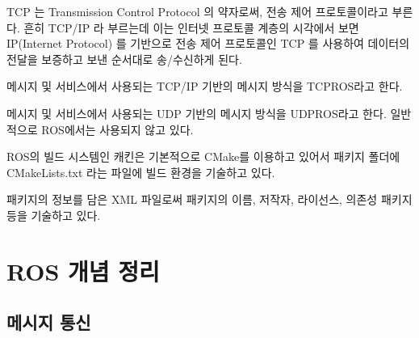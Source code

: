 \vspace{\baselineskip}
\begin{definition}\label{def:RosTCPIP}
TCP 는 Transmission Control Protocol 의 약자로써, 전송 제어 프로토콜이라고 부른다. 흔히 TCP/IP 라 부르는데 이는 인터넷 프로토콜 계층의 시각에서 보면 IP(Internet Protocol) 를 기반으로 전송 제어 프로토콜인 TCP 를 사용하여 데이터의 전달을 보증하고 보낸 순서대로 송/수신하게 된다. 
\end{definition}

\vspace{\baselineskip}
\begin{definition}[TCPROS]\label{def:RosTCPROS}
메시지 및 서비스에서 사용되는 TCP/IP 기반의 메시지 방식을 TCPROS라고 한다.
\end{definition}

\vspace{\baselineskip}
\begin{definition}[UDPROS]\label{def:RosUDPROS}
메시지 및 서비스에서 사용되는 UDP 기반의 메시지 방식을 UDPROS라고 한다. 일반적으로 ROS에서는 사용되지 않고 있다.
\end{definition}

\vspace{\baselineskip}
\begin{definition}\label{def:RosCMakeLists.txt}
ROS의 빌드 시스템인 캐킨은 기본적으로 CMake를 이용하고 있어서 패키지 폴더에 CMakeLists.txt 라는 파일에 빌드 환경을 기술하고 있다.
\end{definition}

\vspace{\baselineskip}
\begin{definition}\label{def:RosPackage.XML}
패키지의 정보를 담은 XML 파일로써 패키지의 이름, 저작자, 라이선스, 의존성 패키지 등을 기술하고 있다.
\end{definition}

\section{ROS 개념 정리}

\subsection{메시지 통신}

